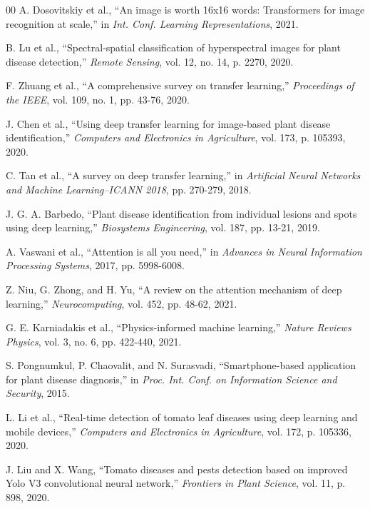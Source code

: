 \documentclass[conference]{IEEEtran}
\begin{document}
\begin{thebibliography}{00}
A. Dosovitskiy et al., ``An image is worth 16x16 words: Transformers for image recognition at scale,'' in \textit{Int. Conf. Learning Representations}, 2021.

B. Lu et al., ``Spectral-spatial classification of hyperspectral images for plant disease detection,'' \textit{Remote Sensing}, vol. 12, no. 14, p. 2270, 2020.

F. Zhuang et al., ``A comprehensive survey on transfer learning,'' \textit{Proceedings of the IEEE}, vol. 109, no. 1, pp. 43-76, 2020.

J. Chen et al., ``Using deep transfer learning for image-based plant disease identification,'' \textit{Computers and Electronics in Agriculture}, vol. 173, p. 105393, 2020.

C. Tan et al., ``A survey on deep transfer learning,'' in \textit{Artificial Neural Networks and Machine Learning–ICANN 2018}, pp. 270-279, 2018.

J. G. A. Barbedo, ``Plant disease identification from individual lesions and spots using deep learning,'' \textit{Biosystems Engineering}, vol. 187, pp. 13-21, 2019.

A. Vaswani et al., ``Attention is all you need,'' in \textit{Advances in Neural Information Processing Systems}, 2017, pp. 5998-6008.

Z. Niu, G. Zhong, and H. Yu, ``A review on the attention mechanism of deep learning,'' \textit{Neurocomputing}, vol. 452, pp. 48-62, 2021.

G. E. Karniadakis et al., ``Physics-informed machine learning,'' \textit{Nature Reviews Physics}, vol. 3, no. 6, pp. 422-440, 2021.

S. Pongnumkul, P. Chaovalit, and N. Surasvadi, ``Smartphone-based application for plant disease diagnosis,'' in \textit{Proc. Int. Conf. on Information Science and Security}, 2015.

L. Li et al., ``Real-time detection of tomato leaf diseases using deep learning and mobile devices,'' \textit{Computers and Electronics in Agriculture}, vol. 172, p. 105336, 2020.

J. Liu and X. Wang, ``Tomato diseases and pests detection based on improved Yolo V3 convolutional neural network,'' \textit{Frontiers in Plant Science}, vol. 11, p. 898, 2020.


\end{thebibliography}
\end{document}
